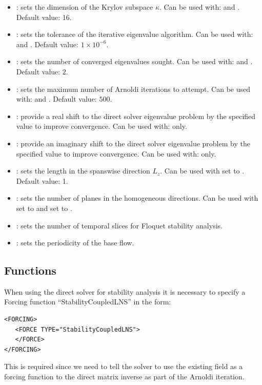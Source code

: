 \begin{itemize}
\item {}: sets the dimension of the Krylov subspace $\kappa$. Can be used with:  and . Default value: 16.
\item {}: sets the tolerance of the iterative eigenvalue algorithm. Can be used with:  and . Default value: $1\times10^{-6}$.
\item {}: sets the number of converged eigenvalues sought. Can be used with:  and . Default value: $2$.
\item {}: sets the maximum number of Arnoldi iterations to attempt. Can be used with:  and . Default value: $500$.
\item {}: provide a real shift to the direct solver eigenvalue problem by the specified value to improve convergence. Can be used with:  only.
\item {}: provide an imaginary shift to the direct solver eigenvalue problem by the specified value to improve convergence. Can be used with:  only.
\item {}:  sets the length in the spanswise direction $L_z$. Can be used with  set to . Default value: 1.
\item {}: sets the number of planes in the homogeneous directions. Can be used with  set to  and  set to .
\item {}: sets the number of temporal slices for Floquet stability analysis.
\item {}: sets the periodicity of the base flow.
\end{itemize}

\subsection{Functions}
When using the direct solver for stability analysis it is necessary to specify a Forcing function ``StabilityCoupledLNS'' in the form:
\begin{lstlisting}[style=XMLStyle]
<FORCING>
   <FORCE TYPE="StabilityCoupledLNS">
   </FORCE>
</FORCING>
\end{lstlisting}

This is required since we need to tell the solver to use the existing
field as a forcing function to the direct matrix inverse as part of
the Arnoldi iteration.


